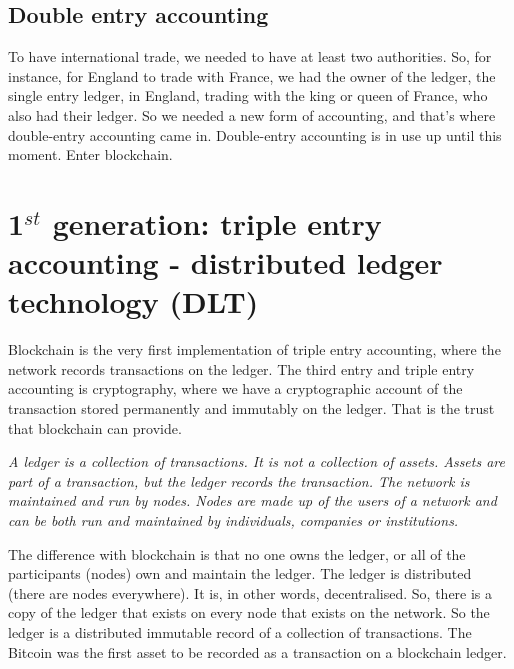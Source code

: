 \subsection{Double entry accounting}
To have international trade, we needed to have at least two authorities. So, for instance, for England to trade with France, we had the owner of the ledger, the single entry ledger, in England, trading with the king or queen of France, who also had their ledger. So we needed a new form of accounting, and that's where double-entry accounting came in. Double-entry accounting is in use up until this moment. Enter blockchain. 

\section{\texorpdfstring{1$^{st}$ generation: triple entry accounting - distributed ledger technology (DLT)}{1st generation: generation: triple entry accounting - distributed ledger technology (DLT)}}
Blockchain is the very first implementation of triple entry accounting, where the network records transactions on the ledger. The third entry and triple entry accounting is cryptography, where we have a cryptographic account of the transaction stored permanently and immutably on the ledger. That is the trust that blockchain can provide.

\medskip 
{}
    \begin{tcolorbox}
    [enhanced,
    title=Distributed Ledger Technology (DLT),
    frame style=
    {left color=orange!85!black,right color=yellow!95!black}]
        
           \textit{A ledger is a collection of transactions. It is not a collection of assets. Assets are part of a transaction, but the ledger records the transaction. The network is maintained and run by nodes. Nodes are made up of the users of a network and can be both run and maintained by individuals, companies or institutions.}
       
\end{tcolorbox}
\medskip

The difference with blockchain is that no one owns the ledger, or all of the participants (nodes) own and maintain the ledger. The ledger is distributed (there are nodes everywhere). It is, in other words, decentralised. So, there is a copy of the ledger that exists on every node that exists on the network. So the ledger is a distributed immutable record of a collection of transactions. The Bitcoin was the first asset to be recorded as a transaction on a blockchain ledger.


